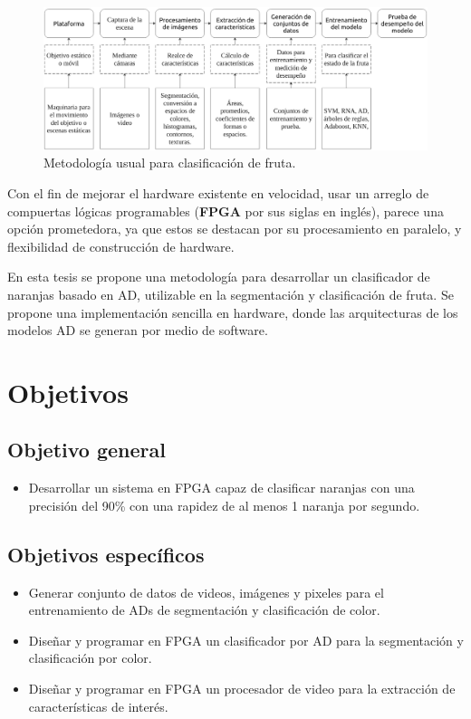\documentclass[twoside,spanish,ESP,MSc]{plantillaLabUPV}
\theoremstyle{definition}
\begin{document}
\begin{figure}[!tbh] 
	\centering 
	\includegraphics[width=\linewidth]{edrawimas/metodosedo} 
	\caption{Metodología usual para clasificación de fruta.} 
	\label{metodos} 
\end{figure}

Con el fin de mejorar el hardware existente en velocidad, usar un arreglo de compuertas lógicas programables (\textbf{FPGA} por sus siglas en inglés), parece una opción prometedora, ya que estos se destacan por su procesamiento en paralelo, y flexibilidad de construcción de hardware.

En esta tesis se propone una metodología para desarrollar un clasificador de naranjas basado en AD, utilizable en la segmentación y clasificación de fruta. Se propone una implementación sencilla en hardware, donde las arquitecturas de los modelos AD se generan por medio de software.

\section{Objetivos}
\subsection*{Objetivo general}
\begin{itemize}[noitemsep]
 \item Desarrollar un sistema en FPGA capaz de clasificar naranjas con una precisión del 90\% con una rapidez de al menos 1 naranja por segundo.
\end{itemize}

\subsection*{Objetivos específicos}
\begin{itemize}[noitemsep]
 \item Generar conjunto de datos de videos, imágenes y pixeles para el entrenamiento de ADs de segmentación y clasificación de color.
 \item Diseñar y programar en FPGA un clasificador por AD para la segmentación y clasificación por color.
 \item Diseñar y programar en FPGA un procesador de video para la extracción de características de interés.

\end{itemize}
\end{document}
